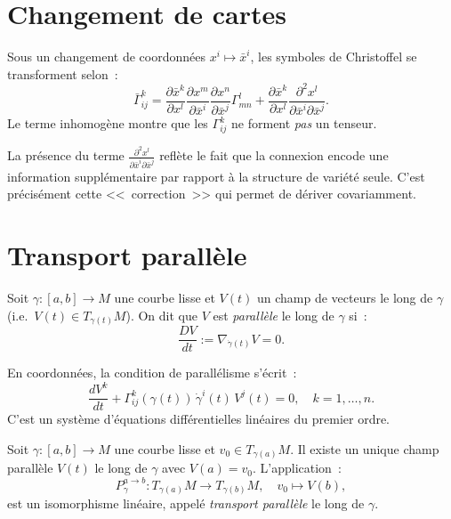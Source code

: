 \section{Changement de cartes}

\begin{proposition}
Sous un changement de coordonn\'ees $x^i \mapsto \bar{x}^i$, les symboles de
Christoffel se transforment selon~:
\[
    \bar{\Gamma}^k_{ij} = \frac{\partial \bar{x}^k}{\partial x^l}
    \frac{\partial x^m}{\partial \bar{x}^i} \frac{\partial x^n}{\partial \bar{x}^j}
    \Gamma^l_{mn}
    + \frac{\partial \bar{x}^k}{\partial x^l}
    \frac{\partial^2 x^l}{\partial \bar{x}^i \partial \bar{x}^j}.
\]
Le terme inhomog\`ene montre que les $\Gamma^k_{ij}$ ne forment \emph{pas} un tenseur.
\end{proposition}

\begin{intuition}[title=\textbf{Les symboles de Christoffel ne sont pas des tenseurs}]
La pr\'esence du terme $\frac{\partial^2 x^l}{\partial \bar{x}^i \partial \bar{x}^j}$
refl\`ete le fait que la connexion encode une information suppl\'ementaire par rapport
\`a la structure de vari\'et\'e seule. C'est pr\'ecis\'ement cette <<~correction~>>
qui permet de d\'eriver covariamment.
\end{intuition}

\section{Transport parall\`ele}

\begin{definition}
Soit $\gamma : [a,b] \to M$ une courbe lisse et $V(t)$ un champ de vecteurs le
long de $\gamma$ (i.e.\ $V(t) \in T_{\gamma(t)}M$). On dit que $V$ est
\emph{parall\`ele} le long de $\gamma$ si~:
\[
    \frac{D V}{dt} := \nabla_{\dot{\gamma}(t)} V = 0.
\]
\end{definition}

En coordonn\'ees, la condition de parall\'elisme s'\'ecrit~:
\[
    \frac{dV^k}{dt} + \Gamma^k_{ij}(\gamma(t))\, \dot{\gamma}^i(t)\, V^j(t) = 0,
    \quad k = 1, \ldots, n.
\]
C'est un syst\`eme d'\'equations diff\'erentielles lin\'eaires du premier ordre.

\begin{theoreme}
Soit $\gamma : [a,b] \to M$ une courbe lisse et $v_0 \in T_{\gamma(a)}M$.
Il existe un unique champ parall\`ele $V(t)$ le long de $\gamma$ avec $V(a) = v_0$.
L'application~:
\[
    P_\gamma^{a \to b} : T_{\gamma(a)}M \to T_{\gamma(b)}M,
    \quad v_0 \mapsto V(b),
\]
est un isomorphisme lin\'eaire, appel\'e \emph{transport parall\`ele} le long de $\gamma$.
\end{theoreme}

